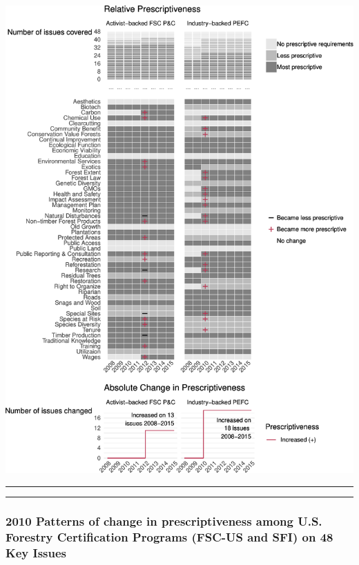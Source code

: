 \documentclass[
      12pt,
        ]{article}
\begin{document}
\begin{center}\includegraphics{Figs/FSC-PEFC-1} \end{center}

\begin{center}\rule{0.5\linewidth}{\linethickness}\end{center}

\begin{center}\rule{0.5\linewidth}{\linethickness}\end{center}

\subsubsection{2010 Patterns of change in prescriptiveness among U.S.
Forestry Certification Programs (FSC-US and SFI) on 48 Key
Issues}\label{patterns-of-change-in-prescriptiveness-among-u.s.-forestry-certification-programs-fsc-us-and-sfi-on-48-key-issues}
\end{document}
